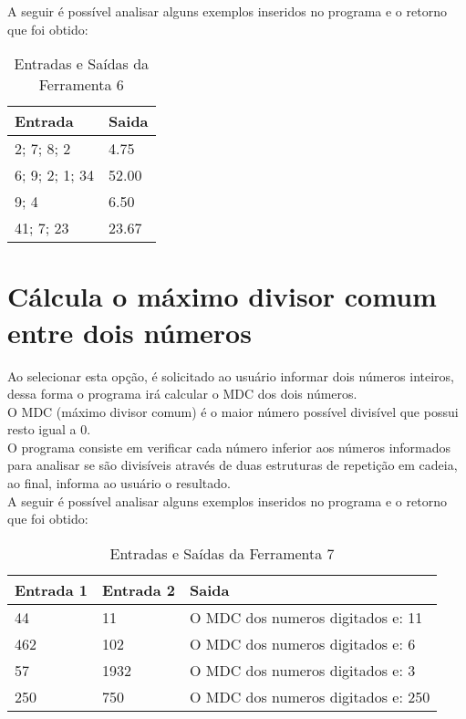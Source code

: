 \documentclass[12pt]{article}
\begin{document}
A seguir é possível analisar alguns exemplos inseridos no programa e o retorno que foi obtido:

\FloatBarrier
\begin{table}[ht]
\centering
\begin{tabular}{|l|l|}
\hline
\textbf{Entrada} & \textbf{Saida}\\
\hline
2;  7;  8;  2 & 4.75\\
6;  9;  2;  1; 34 & 52.00\\
9;  4 & 6.50\\
41; 7;  23 & 23.67\\

\hline
\end{tabular}
\caption{Entradas e Saídas da Ferramenta 6}
\end{table} 

\newpage

\section{Cálcula o máximo divisor comum entre dois números}
Ao selecionar esta opção, é solicitado ao usuário informar dois números inteiros, dessa forma o programa irá calcular o MDC dos dois números. \\
O MDC (máximo divisor comum) é o maior número possível divisível que possui resto igual a 0. \\
O programa consiste em verificar cada número inferior aos números informados para analisar se são divisíveis através de duas estruturas de repetição em cadeia, ao final, informa ao usuário o resultado. \\
A seguir é possível analisar alguns exemplos inseridos no programa e o retorno que foi obtido:

\FloatBarrier
\begin{table}[ht]
\centering
\begin{tabular}{|l|l|l|}
\hline
\textbf{Entrada 1} & \textbf{Entrada 2} & \textbf{Saida}\\
\hline
44 & 11 & O MDC dos numeros digitados e: 11\\
462 & 102 & O MDC dos numeros digitados e: 6\\
57 & 1932 & O MDC dos numeros digitados e: 3\\
250 & 750 & O MDC dos numeros digitados e: 250\\

\hline
\end{tabular}
\caption{Entradas e Saídas da Ferramenta 7}
\end{table} 
\end{document}
